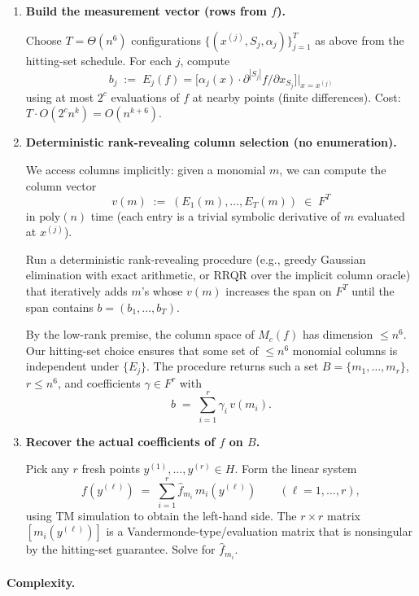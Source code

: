 \documentclass[12pt]{article}
\theoremstyle{definition}
\theoremstyle{definition}
\theoremstyle{remark}
\theoremstyle{remark}
\begin{document}
\begin{enumerate}
\item \textbf{Build the measurement vector (rows from $f$).}

Choose $T = \Theta(n^6)$ configurations $\{(x^{(j)}, S_j, \alpha_j)\}_{j=1}^T$ as above from the hitting-set schedule. For each $j$, compute
\[
b_j \;:=\; E_j(f) = \bigl[\alpha_j(x) \cdot \partial^{|S_j|} f/\partial x_{S_j}\bigr]\big|_{x = x^{(j)}}
\]
using at most $2^c$ evaluations of $f$ at nearby points (finite differences). Cost: $T \cdot O(2^c n^k) = O(n^{k+6})$.

\item \textbf{Deterministic rank-revealing column selection (no enumeration).}

We access columns implicitly: given a monomial $m$, we can compute the column vector
\[
v(m) \;:=\; (E_1(m), \ldots, E_T(m)) \;\in\; F^T
\]
in $\mathrm{poly}(n)$ time (each entry is a trivial symbolic derivative of $m$ evaluated at $x^{(j)}$).

Run a deterministic rank-revealing procedure (e.g., greedy Gaussian elimination with exact arithmetic, or RRQR over the implicit column oracle) that iteratively adds $m$'s whose $v(m)$ increases the span on $F^T$ until the span contains $b = (b_1, \ldots, b_T)$.

By the low-rank premise, the column space of $M_c(f)$ has dimension $\le n^6$. Our hitting-set choice ensures that some set of $\le n^6$ monomial columns is independent under $\{E_j\}$. The procedure returns such a set $B = \{m_1, \ldots, m_r\}$, $r \le n^6$, and coefficients $\gamma \in F^r$ with
\[
b \;=\; \sum_{i=1}^r \gamma_i\, v(m_i).
\]

\item \textbf{Recover the actual coefficients of $f$ on $B$.}

Pick any $r$ fresh points $y^{(1)}, \ldots, y^{(r)} \in H$. Form the linear system
\[
f(y^{(\ell)}) \;=\; \sum_{i=1}^r \hat{f}_{m_i}\, m_i(y^{(\ell)}) \qquad (\ell = 1, \ldots, r),
\]
using TM simulation to obtain the left-hand side. The $r \times r$ matrix $[m_i(y^{(\ell)})]$ is a Vandermonde-type/evaluation matrix that is nonsingular by the hitting-set guarantee. Solve for $\hat{f}_{m_i}$.
\end{enumerate}

\paragraph{Complexity.}
\end{document}
